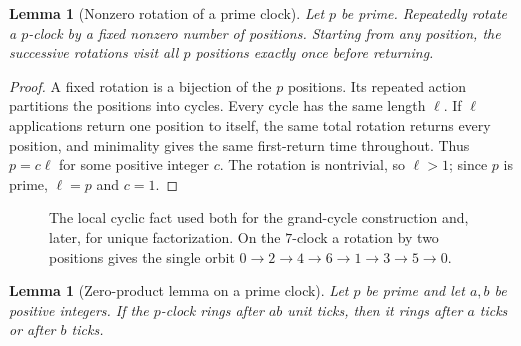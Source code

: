 \documentclass[11pt,a4paper]{article}
\theoremstyle{clockplain}
\newtheorem{lemma}[proposition]{Lemma}
\theoremstyle{definition}
\theoremstyle{remark}
\begin{document}
\begin{lemma}[Nonzero rotation of a prime clock]
\label{lem:prime-rotation}
Let $p$ be prime.  Repeatedly rotate a $p$-clock by a fixed nonzero number of positions.  Starting from any position, the successive rotations visit all $p$ positions exactly once before returning.
\end{lemma}

\begin{proof}
A fixed rotation is a bijection of the $p$ positions.  Its repeated action partitions the positions into cycles.  Every cycle has the same length $\ell$.  If $\ell$ applications return one position to itself, the same total rotation returns every position, and minimality gives the same first-return time throughout.  Thus $p=c\ell$ for some positive integer $c$.  The rotation is nontrivial, so $\ell>1$; since $p$ is prime, $\ell=p$ and $c=1$.
\end{proof}

\begin{figure}[ht]
\centering
{}
\caption{The local cyclic fact used both for the grand-cycle construction and, later, for unique factorization. On the $7$-clock a rotation by two positions gives the single orbit $0\to2\to4\to6\to1\to3\to5\to0$.}
\label{fig:clock-cycle}
\end{figure}

\begin{lemma}[Zero-product lemma on a prime clock]
\label{lem:clock-zero-product}
Let $p$ be prime and let $a,b$ be positive integers.  If the $p$-clock rings after $ab$ unit ticks, then it rings after $a$ ticks or after $b$ ticks.
\end{lemma}
\end{document}
